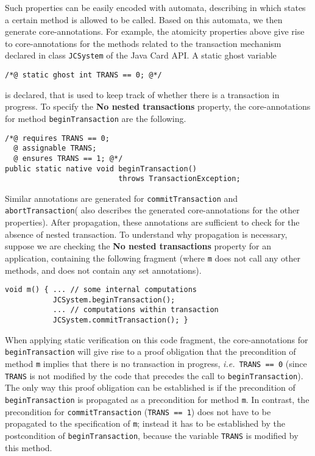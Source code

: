 Such properties can be easily encoded with automata, describing in
which states a certain method is allowed to be called. Based on this
automata, we then generate core-annotations. For example, the
atomicity properties above give rise to core-annotations for the
methods related to the transaction mechanism declared in class
\texttt{JCSystem} of the Java Card API. A static ghost variable 
\begin{verbatim}
/*@ static ghost int TRANS == 0; @*/
\end{verbatim}
is declared, that is used to keep track of whether there is a
transaction in progress.  To specify the \textbf{No nested
transactions} property, the core-annotations for method
\texttt{beginTransaction} are the following. 

\begin{verbatim}
/*@ requires TRANS == 0;
  @ assignable TRANS;
  @ ensures TRANS == 1; @*/
public static native void beginTransaction() 
                          throws TransactionException;
\end{verbatim}
Similar annotations are generated for \texttt{commitTransaction} and
\texttt{abortTransaction}(\cite{PavlovaBBHL04cardis} also
describes the generated core-annotations for the other
properties). After propagation, these annotations are sufficient to
check for the absence of nested transaction.  To understand why
propagation is necessary, suppose we are checking the \textbf{No
nested transactions} property for an application, containing the
following fragment (where
\texttt{m} does not call any other methods, and does not contain any
set annotations).

\begin{verbatim}
void m() { ... // some internal computations
           JCSystem.beginTransaction();
           ... // computations within transaction
           JCSystem.commitTransaction(); }
\end{verbatim}

When applying static verification on this code fragment, the
core-annotations for \texttt{beginTransaction} will give rise to a
proof obligation that the precondition of method
\texttt{m} implies that there is no transaction in progress,
\emph{i.e.}\ \texttt{TRANS == 0} (since \texttt{TRANS} is not modified
by the code that precedes the call to \texttt{beginTransaction}). The
only way this proof obligation can be established is if the
precondition of \texttt{beginTransaction} is propagated as a
precondition for method \texttt{m}. In contrast, the precondition for
\texttt{commitTransaction} (\texttt{TRANS == 1}) does not have to be
propagated to the specification of \texttt{m}; instead it has to be
established by the postcondition of \texttt{begin\-Transaction},
because the variable \texttt{TRANS} is modified by this method.

